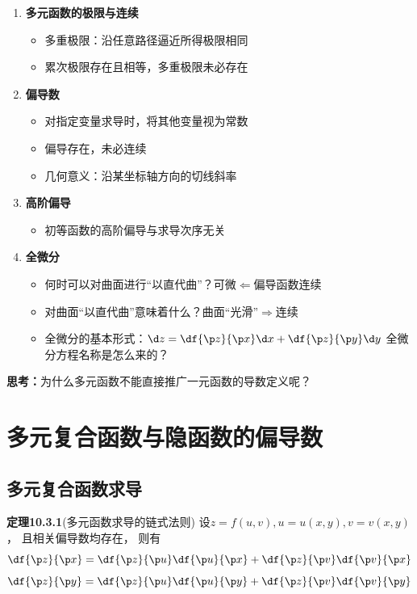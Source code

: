 \begin{enumerate}[(1)]
  \setlength{\itemindent}{1cm}
  \item {\bf 多元函数的极限与连续}
  \begin{itemize}
    \item 多重极限：沿任意路径逼近所得极限相同
    \item 累次极限存在且相等，多重极限未必存在
  \end{itemize}
  \item {\bf 偏导数}
  \begin{itemize}
    \item 对指定变量求导时，将其他变量视为常数
    \item 偏导存在，未必连续
    \item 几何意义：沿某坐标轴方向的切线斜率
  \end{itemize}
  \item {\bf 高阶偏导}
  \begin{itemize}
    \item 初等函数的高阶偏导与求导次序无关
  \end{itemize}
  \item {\bf 全微分}
  \begin{itemize}
    \item 何时可以对曲面进行“以直代曲”？\hfill 可微$\Leftarrow$偏导函数连续
    \item 对曲面“以直代曲”意味着什么？\hfill 曲面“光滑”$\Rightarrow$连续
    \item 全微分的基本形式：${\d z=\df{\p z}{\p x}\d x+\df{\p z}{\p y}\d y}$
    \hfill 全微分方程名称是怎么来的？
  \end{itemize}
\end{enumerate}

{\bf 思考：}为什么多元函数不能直接推广一元函数的导数定义呢？

\section{多元复合函数与隐函数的偏导数}

\subsection{多元复合函数求导}

{\bf 定理10.3.1}(多元函数求导的链式法则)
设$z=f(u,v),u=u(x,y),v=v(x,y)$， 且相关偏导数均存在， 则有
$${\df{\p z}{\p x}=\df{\p z}{\p u}\df{\p u}{\p x}
+\df{\p z}{\p v}\df{\p v}{\p x}}$$
$${\df{\p z}{\p y}=\df{\p z}{\p u}\df{\p u}{\p y}
+\df{\p z}{\p v}\df{\p v}{\p y}}$$

